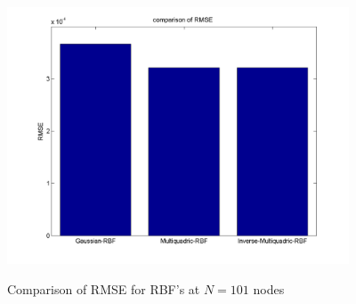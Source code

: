 \documentclass[12pt]{article}
\numberwithin{equation}{subsection} %
\begin{document}
\newpage
 \begin{figure}[h]
\begin{center}

\includegraphics*[height=3in]{barmse.png}\
\end{center}
\vspace{-0.5in}
\caption{Comparison of  RMSE for RBF's at $N=101$ nodes  }


\end{figure}
\newpage
\end{document}
